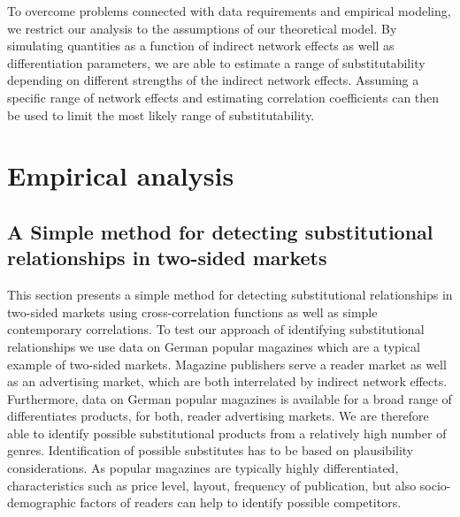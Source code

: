\documentclass[12pt,a4paper,notitlepage]{article}
\begin{document}
To overcome problems connected with data requirements and empirical modeling, we restrict our analysis to the assumptions of our theoretical model. By simulating quantities as a function of indirect network effects as well as differentiation parameters, we are able to estimate a range of substitutability depending on different strengths of the indirect network effects. Assuming a specific range of network effects and estimating correlation coefficients can then be used to limit the most likely range of substitutability.  



%	








\section{Empirical analysis}\label{empirical}

\subsection{A Simple method for detecting substitutional relationships in two-sided markets}

This section presents a simple method for detecting substitutional relationships in two-sided markets using cross-correlation functions as well as simple contemporary correlations. To test our approach of identifying substitutional relationships we use data on German popular magazines which are a typical example of two-sided markets. Magazine publishers serve a reader market as well as an advertising market, which are both interrelated by indirect network effects. Furthermore, data on German popular magazines is available for a broad range of differentiates products, for both, reader advertising markets. We are therefore able to identify possible substitutional products from a relatively high number of genres. Identification of possible substitutes has to be based on plausibility considerations. As popular magazines are typically highly differentiated, characteristics such as price level, layout, frequency of publication, but also socio-demographic factors of readers can help to identify possible competitors.  
\end{document}
